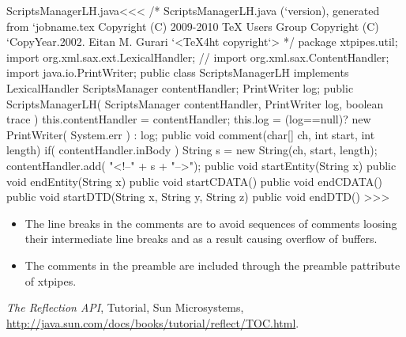 \documentclass{article}
\begin{document}
\<ScriptsManagerLH.java\><<<
/* ScriptsManagerLH.java (`version), generated from `jobname.tex
   Copyright (C) 2009-2010 TeX Users Group
   Copyright (C) `CopyYear.2002. Eitan M. Gurari
`<TeX4ht copyright`> */
package xtpipes.util;
import org.xml.sax.ext.LexicalHandler;
// import org.xml.sax.ContentHandler;
import java.io.PrintWriter;
public class ScriptsManagerLH implements LexicalHandler {
       ScriptsManager contentHandler;
       PrintWriter log;
   public ScriptsManagerLH( ScriptsManager contentHandler,
                          PrintWriter log, boolean trace ){
     this.contentHandler = contentHandler;
     this.log = (log==null)? new PrintWriter( System.err ) : log;
   }
   public void comment(char[] ch, int start, int length){
     if( contentHandler.inBody ){
        String s = new String(ch, start, length);
        contentHandler.add(  "<!--" + s + "\n-->");
   } }
   public void startEntity(String x){}
   public void endEntity(String x){}
   public void startCDATA(){}
   public void endCDATA(){}
   public void startDTD(String x, String y, String z){}
   public void endDTD(){}
}
>>>

\begin{itemize}
\item
The line breaks in the comments are to avoid sequences of comments
loosing their intermediate line breaks and as a result causing
overflow of buffers.

\item The comments in the preamble are included through the
preamble pattribute of xtpipes.
\end{itemize}











\begin{thebibliography}{10}
{\sl The Reflection API},
Tutorial, Sun Microsystems,
\url{http://java.sun.com/docs/books/tutorial/reflect/TOC.html}.
\end{thebibliography}





{
}
{ 
}
\end{document}
